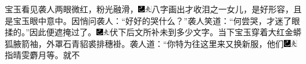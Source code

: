 宝玉看见袭人两眼微红，粉光融滑，{\includegraphics[width=3mm]{../Images/00003}\includegraphics[width=3mm]{../Images/00012}\footnotesize \kaishu 八字画出才收泪之一女儿，是好形容，且是宝玉眼中意中。}因悄问袭人：“好好的哭什么？”袭人笑道：“何尝哭，才迷了眼揉的。”因此便遮掩过了。{\includegraphics[width=3mm]{../Images/00003}\includegraphics[width=3mm]{../Images/00012}\footnotesize \kaishu 伏下后文所补未到多少文字。}当下宝玉穿着大红金蟒狐腋箭袖，外罩石青貂裘排穗褂。袭人道：“你特为往这里来又换新服，他们{\includegraphics[width=3mm]{../Images/00003}\includegraphics[width=3mm]{../Images/00012}\footnotesize \kaishu 指晴雯麝月等。}就不
